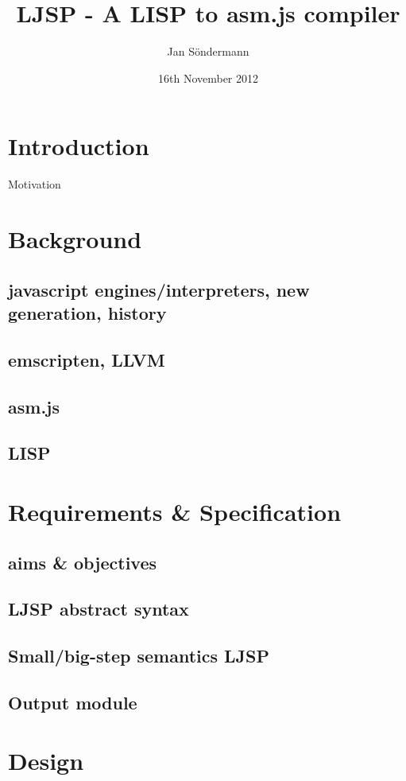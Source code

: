 \documentclass[11pt]{report}
\title{LJSP - A LISP to asm.js compiler}
\author{Jan S\"ondermann}
\date{16th November 2012}
\begin{document}
\maketitle


\tableofcontents

\chapter{Introduction}
Motivation

\chapter{Background}
\section{javascript engines/interpreters, new generation, history}
\section{emscripten, LLVM}
\section{asm.js}
\section{LISP}

\chapter{Requirements \& Specification}
\section{aims \& objectives}
\section{LJSP abstract syntax}
\section{Small/big-step semantics LJSP}
\section{Output module}

\chapter{Design}
\end{document}
